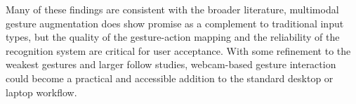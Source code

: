 \documentclass[manuscript]{acmart}
\begin{document}
Many of these findings are consistent with the broader literature, multimodal gesture augmentation does show promise as a complement to traditional input types, but the quality of the gesture-action mapping and the reliability of the recognition system are critical for user acceptance. With some refinement to the weakest gestures and larger follow studies, webcam-based gesture interaction could become a practical and accessible addition to the standard desktop or laptop workflow.




\end{document}
